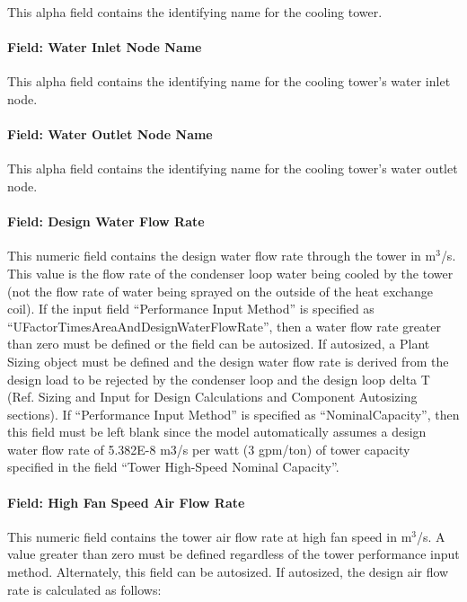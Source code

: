 This alpha field contains the identifying name for the cooling tower.

\paragraph{Field: Water Inlet Node Name}\label{field-water-inlet-node-name-1}

This alpha field contains the identifying name for the cooling tower's water inlet node.

\paragraph{Field: Water Outlet Node Name}\label{field-water-outlet-node-name-1}

This alpha field contains the identifying name for the cooling tower's water outlet node.

\paragraph{Field: Design Water Flow Rate}\label{field-design-water-flow-rate-1}

This numeric field contains the design water flow rate through the tower in m\(^{3}\)/s. This value is the flow rate of the condenser loop water being cooled by the tower (not the flow rate of water being sprayed on the outside of the heat exchange coil). If the input field ``Performance Input Method'' is specified as ``UFactorTimesAreaAndDesignWaterFlowRate'', then a water flow rate greater than zero must be defined or the field can be autosized. If autosized, a Plant Sizing object must be defined and the design water flow rate is derived from the design load to be rejected by the condenser loop and the design loop delta T (Ref. Sizing and Input for Design Calculations and Component Autosizing sections). If ``Performance Input Method'' is specified as ``NominalCapacity'', then this field must be left blank since the model automatically assumes a design water flow rate of 5.382E-8 m3/s per watt (3 gpm/ton) of tower capacity specified in the field ``Tower High-Speed Nominal Capacity''.

\paragraph{Field: High Fan Speed Air Flow Rate}\label{field-high-fan-speed-air-flow-rate}

This numeric field contains the tower air flow rate at high fan speed in m\(^{3}\)/s. A value greater than zero must be defined regardless of the tower performance input method. Alternately, this field can be autosized. If autosized, the design air flow rate is calculated as follows:

